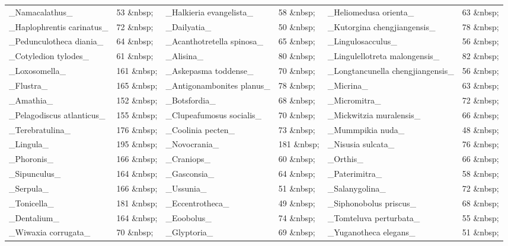 \documentclass[openany]{book}
\theoremstyle{definition}
\theoremstyle{definition}
\theoremstyle{definition}
\theoremstyle{remark}
\begin{document}
\begin{tabular}{l|l|l|l|l|l}
\hline
 &  &  &  &  & \\
\hline
\_Namacalathus\_ & 53   \&nbsp; & \_Halkieria evangelista\_ & 58   \&nbsp; & \_Heliomedusa orienta\_ & 63   \&nbsp;\\
\hline
\_Haplophrentis carinatus\_ & 72   \&nbsp; & \_Dailyatia\_ & 50   \&nbsp; & \_Kutorgina chengjiangensis\_ & 78   \&nbsp;\\
\hline
\_Pedunculotheca diania\_ & 64   \&nbsp; & \_Acanthotretella spinosa\_ & 65   \&nbsp; & \_Lingulosacculus\_ & 56   \&nbsp;\\
\hline
\_Cotyledion tylodes\_ & 61   \&nbsp; & \_Alisina\_ & 80   \&nbsp; & \_Lingulellotreta malongensis\_ & 82   \&nbsp;\\
\hline
\_Loxosomella\_ & 161   \&nbsp; & \_Askepasma toddense\_ & 70   \&nbsp; & \_Longtancunella chengjiangensis\_ & 56   \&nbsp;\\
\hline
\_Flustra\_ & 165   \&nbsp; & \_Antigonambonites planus\_ & 78   \&nbsp; & \_Micrina\_ & 63   \&nbsp;\\
\hline
\_Amathia\_ & 152   \&nbsp; & \_Botsfordia\_ & 68   \&nbsp; & \_Micromitra\_ & 72   \&nbsp;\\
\hline
\_Pelagodiscus atlanticus\_ & 155   \&nbsp; & \_Clupeafumosus socialis\_ & 70   \&nbsp; & \_Mickwitzia muralensis\_ & 66   \&nbsp;\\
\hline
\_Terebratulina\_ & 176   \&nbsp; & \_Coolinia pecten\_ & 73   \&nbsp; & \_Mummpikia nuda\_ & 48   \&nbsp;\\
\hline
\_Lingula\_ & 195   \&nbsp; & \_Novocrania\_ & 181   \&nbsp; & \_Nisusia sulcata\_ & 76   \&nbsp;\\
\hline
\_Phoronis\_ & 166   \&nbsp; & \_Craniops\_ & 60   \&nbsp; & \_Orthis\_ & 66   \&nbsp;\\
\hline
\_Sipunculus\_ & 164   \&nbsp; & \_Gasconsia\_ & 64   \&nbsp; & \_Paterimitra\_ & 58   \&nbsp;\\
\hline
\_Serpula\_ & 166   \&nbsp; & \_Ussunia\_ & 51   \&nbsp; & \_Salanygolina\_ & 72   \&nbsp;\\
\hline
\_Tonicella\_ & 181   \&nbsp; & \_Eccentrotheca\_ & 49   \&nbsp; & \_Siphonobolus priscus\_ & 68   \&nbsp;\\
\hline
\_Dentalium\_ & 164   \&nbsp; & \_Eoobolus\_ & 74   \&nbsp; & \_Tomteluva perturbata\_ & 55   \&nbsp;\\
\hline
\_Wiwaxia corrugata\_ & 70   \&nbsp; & \_Glyptoria\_ & 69   \&nbsp; & \_Yuganotheca elegans\_ & 51   \&nbsp;\\
\hline
\end{tabular}
\end{document}
